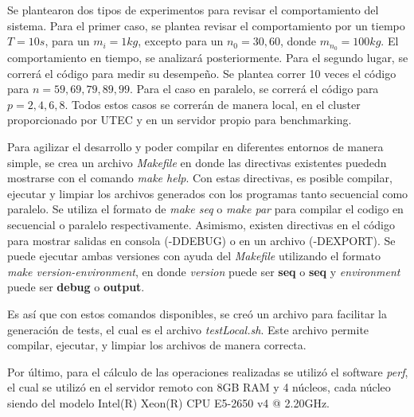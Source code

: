 Se plantearon dos tipos de experimentos para revisar el comportamiento del sistema. Para el primer caso, se plantea revisar el comportamiento por un tiempo $T = 10s$, para un $m_i = 1 kg$, excepto para un $n_0 = 30, 60$, donde $m_{n_0} = 100 kg$. El comportamiento en tiempo, se analizará posteriormente. Para el segundo lugar, se correrá el código para medir su desempeño. Se plantea correr 10 veces el código para $n={59,69,79,89,99}$. Para el caso en paralelo, se correrá el código para $p={2,4,6,8}$. Todos estos casos se correrán de manera local, en el cluster proporcionado por UTEC y en un servidor propio para benchmarking.

Para agilizar el desarrollo y poder compilar en diferentes entornos de manera simple, se crea un archivo \textit{Makefile} en donde las directivas existentes puededn mostrarse con el comando \textit{make help}. Con estas directivas, es posible compilar, ejecutar y limpiar los archivos generados con los programas tanto secuencial como paralelo. Se utiliza el formato de \textit{make seq} o \textit{make par} para compilar el codigo en secuencial o paralelo respectivamente. Asimismo, existen directivas en el código para mostrar salidas en consola (-DDEBUG) o en un archivo (-DEXPORT). Se puede ejecutar ambas versiones con ayuda del \textit{Makefile} utilizando el formato \textit{make version-environment}, en donde \textit{version} puede ser \textbf{seq} o \textbf{seq} y \textit{environment} puede ser \textbf{debug} o \textbf{output}. 

Es así que con estos comandos disponibles, se creó un archivo para facilitar la generación de tests, el cual es el archivo \textit{testLocal.sh}. Este archivo permite compilar, ejecutar, y limpiar los archivos de manera correcta.

Por último, para el cálculo de las operaciones realizadas se utilizó el software \textit{perf}, el cual se utilizó en el servidor remoto con 8GB RAM y 4 núcleos, cada núcleo siendo del modelo Intel(R) Xeon(R) CPU E5-2650 v4 @ 2.20GHz. 